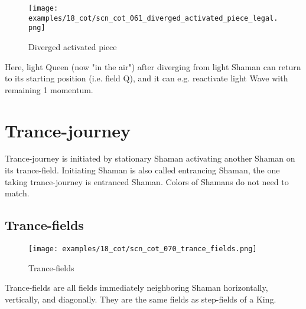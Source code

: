 \vspace*{2.9\baselineskip}
\noindent
\begin{wrapfigure}[6]{l}{0.4\textwidth}
\centering
\texttt{[image: examples/18\_cot/scn\_cot\_061\_diverged\_activated\_piece\_legal.png]}
\vspace*{-0.4\baselineskip}
\caption{Diverged activated piece}
\label{fig:scn_cot_061_diverged_activated_piece_legal}
\end{wrapfigure}
Here, light Queen (now "in the air") after diverging from light Shaman can return
to its starting position (i.e. field Q), and it can e.g. reactivate light Wave with
remaining 1 momentum.

\clearpage %

\section*{Trance-journey}
\label{sec:Conquest of Tlalocan/Trance-journey}

\vspace*{-0.7\baselineskip}
Trance-journey is initiated by stationary Shaman activating another Shaman
on its trance-field. Initiating Shaman is also called entrancing Shaman, the
one taking trance-journey is entranced Shaman.
Colors of Shamans do not need to match.

\vspace*{-0.7\baselineskip}
\subsection*{Trance-fields}
\label{sec:Conquest of Tlalocan/Trance-journey/Trance-fields}

\vspace*{-0.9\baselineskip}
\noindent
\begin{wrapfigure}[5]{l}{0.4\textwidth}
\centering
\texttt{[image: examples/18\_cot/scn\_cot\_070\_trance\_fields.png]}
\vspace*{-0.4\baselineskip}
\caption{Trance-fields}
\label{fig:scn_cot_070_trance_fields}
\end{wrapfigure}
Trance-fields are all fields immediately neighboring Shaman horizontally,
vertically, and diagonally. They are the same fields as step-fields of a King.

